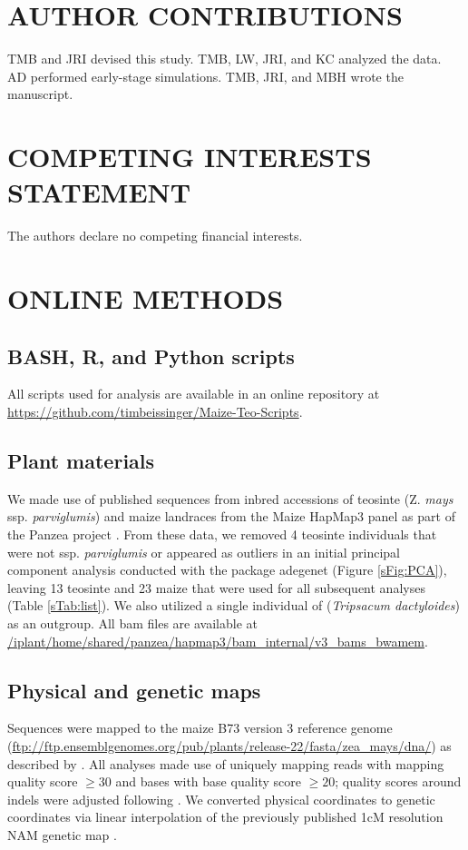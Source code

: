 \documentclass[12pt,a4paper]{article}
\begin{document}
\section*{AUTHOR CONTRIBUTIONS}
TMB and JRI devised this study. TMB, LW, JRI, and KC analyzed the data. AD performed early-stage simulations. TMB, JRI, and MBH wrote the manuscript.

\section*{COMPETING INTERESTS STATEMENT}
The authors declare no competing financial interests.

\section*{ONLINE METHODS}
\subsection*{BASH, R, and Python scripts}
All scripts used for analysis are available in an online repository at \url{https://github.com/timbeissinger/Maize-Teo-Scripts}. 

\subsection*{Plant materials}
We made use of published sequences from inbred accessions of teosinte (Z. {\it mays} ssp. {\it parviglumis}) and maize landraces from the Maize HapMap3 panel as part of the Panzea project  \cite{chia2012, lemmon2014, bukowski2015}. 
From these data, we removed 4 teosinte individuals that were not ssp. \textit{parviglumis} or appeared as outliers in an initial principal component analysis conducted with the package adegenet \cite{jombart2011} (Figure \ref{sFig:PCA}), leaving 13 teosinte and 23 maize that were used for all subsequent analyses (Table \ref{sTab:list}). We also utilized a single individual of (\textit{Tripsacum dactyloides}) as an outgroup.  All bam files are available at \url{/iplant/home/shared/panzea/hapmap3/bam\_internal/v3\_bams\_bwamem}. 

\subsection*{Physical and genetic maps}
Sequences were mapped to the maize B73 version 3 reference genome \cite{schnable2009} (\url{ftp://ftp.ensemblgenomes.org/pub/plants/release-22/fasta/zea\_mays/dna/}) as described by \cite{bukowski2015}. 
All analyses made use of uniquely mapping reads with mapping quality score $\geq  30$ and bases with base quality score $\geq 20$; quality scores around indels were adjusted following \cite{li2011statistical}.
We converted physical coordinates to genetic coordinates via linear interpolation of the previously published 1cM resolution NAM genetic map \cite{glaubitz2014}. 
\end{document}
